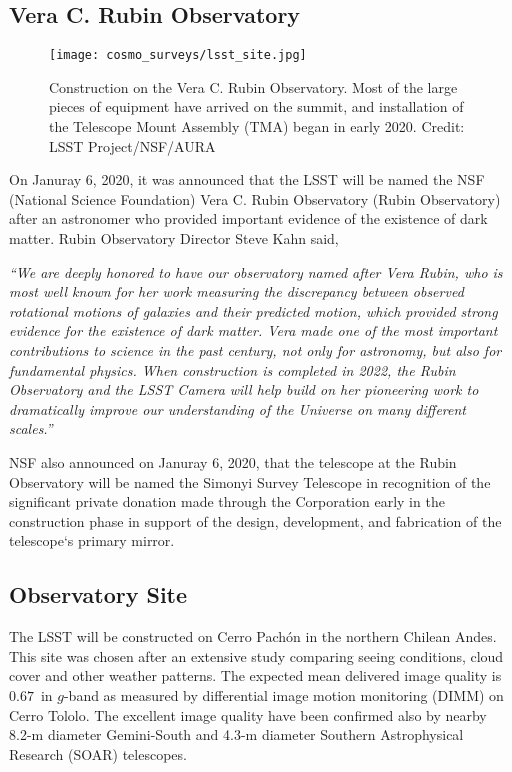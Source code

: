\subsection{Vera C. Rubin Observatory}
\begin{figure}[ht]
    \centering
    \texttt{[image: cosmo\_surveys/lsst\_site.jpg]}
    \caption{Construction on the Vera C. Rubin Observatory. Most of the large pieces of equipment have arrived on the summit, and installation of the Telescope Mount Assembly (TMA) began in early 2020. Credit: LSST Project/NSF/AURA}
    \label{fig:lsst_site}
\end{figure}
On Januray 6, 2020, it was announced that the LSST will be named the NSF (National Science Foundation) Vera C. Rubin Observatory (Rubin Observatory) after an astronomer who provided important evidence of the existence of dark matter. Rubin Observatory Director Steve Kahn said,

\textit{``We are deeply honored to have our observatory named after Vera Rubin, who is most well known for her work measuring the discrepancy between observed rotational motions of galaxies and their predicted motion, which provided strong evidence for the existence of dark matter. Vera made one of the most important contributions to science in the past century, not only for astronomy, but also for fundamental physics. When construction is completed in 2022, the Rubin Observatory and the LSST Camera will help build on her pioneering work to dramatically improve our understanding of the Universe on many different scales.''}

NSF also announced on Januray 6, 2020, that the telescope at the Rubin Observatory will be named the Simonyi Survey Telescope in recognition of the significant private donation made through the Corporation early in the construction phase in support of the design, development, and fabrication of the telescope`s primary mirror. 

\subsection{Observatory Site}
The LSST will be constructed on Cerro Pach\'{o}n in the northern Chilean Andes. This site was chosen after an extensive study comparing seeing conditions, cloud cover and other weather patterns. The expected mean delivered image quality is $0.67$\arcsec\ in $g$-band as measured by differential image motion monitoring (DIMM) on Cerro Tololo. The excellent image quality have been confirmed also by nearby 8.2-m diameter Gemini-South and 4.3-m diameter Southern Astrophysical Research (SOAR) telescopes.

